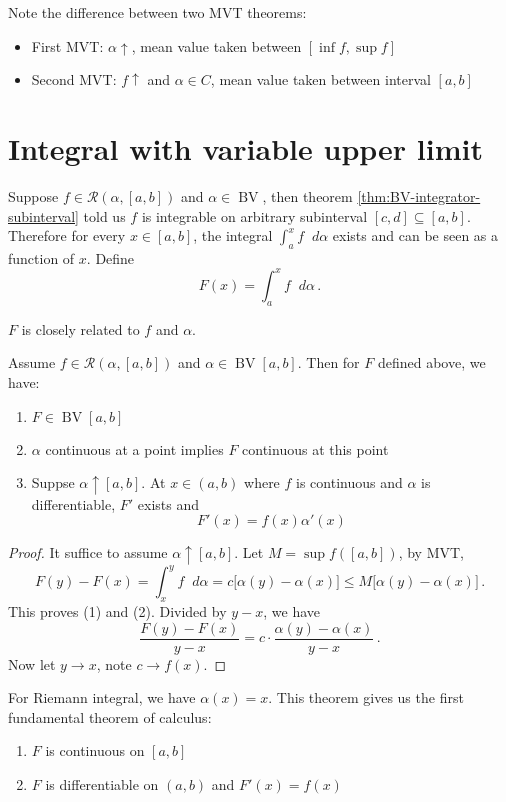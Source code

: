 \documentclass{article}
\newcommand{\Riemann}{\mathcal R}
\newcommand{\dd}{\mathop{}\!d}
\newcommand{\increasing}{\uparrow}
\DeclareMathOperator{\BV}{BV}
\begin{document}
Note the difference between two MVT theorems:
\begin{itemize}
    \item First MVT: $ \alpha \increasing $, mean value taken between $ [\inf f, \sup f] $
    \item Second MVT: $ f \increasing $ and $ \alpha \in C $, mean value taken between interval $ [a, b] $
\end{itemize}

\section{Integral with variable upper limit}
Suppose $ f \in \Riemann(\alpha, [a, b]) $ and $ \alpha \in \BV $, then theorem \ref{thm:BV-integrator-subinterval} told us $ f $ is integrable on arbitrary subinterval $ [c, d] \subseteq [a, b] $. Therefore for every $ x \in [a, b] $, the integral $ \int_a^x f \dd \alpha $ exists and can be seen as a function of $ x $. Define
\[ 
    F(x) = \int_a^x f \dd \alpha \,.
\]

$ F $ is closely related to $ f $ and $ \alpha $.
\begin{theorem}
    Assume $ f \in \Riemann(\alpha, [a, b]) $ and $ \alpha \in \BV[a, b] $. Then for $ F $ defined above, we have:
    \begin{enumerate}
        \item $ F \in \BV[a, b] $
        \item $ \alpha $ continuous at a point implies $ F $ continuous at this point
        \item Suppse $ \alpha \increasing [a, b] $. At $ x \in (a, b) $ where $ f $ is continuous and $ \alpha $ is differentiable, $ F' $ exists and
        \[ 
            F'(x) = f(x) \alpha'(x)
        \]
    \end{enumerate}
\end{theorem}

\begin{proof}
    It suffice to assume $ \alpha \increasing [a, b] $. Let $ M = \sup f([a, b]) $, by MVT, 
    \[ 
        F(y) - F(x) = \int_x^y f \dd \alpha = c \big[ \alpha(y) - \alpha(x) \big] \leqslant M \big[ \alpha(y) - \alpha(x) \big] \,.
    \]
    This proves (1) and (2). Divided by $ y - x $, we have
    \[ 
        \dfrac{F(y) - F(x)}{y - x} = c \cdot \dfrac{\alpha(y) - \alpha(x)}{y - x} \,.
    \]
    Now let $ y \to x $, note $ c \to f(x) $.
\end{proof}

For Riemann integral, we have $ \alpha(x) = x $. This theorem gives us the first fundamental theorem of calculus:
\begin{enumerate}
    \item $ F $ is continuous on $ [a, b] $
    \item $ F $ is differentiable on $ (a, b) $ and $ F'(x) = f(x) $
\end{enumerate}
\end{document}
